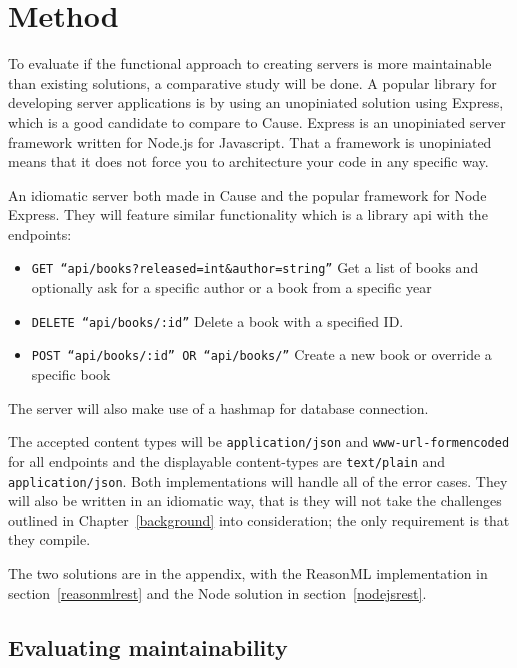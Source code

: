 \chapter{Method}\label{method}

To evaluate if the functional approach to creating servers is more maintainable
than existing solutions, a comparative study will be done. A popular library
for developing server applications is by using an unopiniated solution using
Express, which is a good candidate to compare to Cause. Express is an
unopiniated server framework written for Node.js for Javascript.  That a
framework is unopiniated means that it does not force you to architecture your
code in any specific way.  

An idiomatic server both made in Cause and the popular framework
for Node Express. They will feature similar functionality which is a library api
with the endpoints:

\begin{itemize}
    \item \texttt{GET ``api/books?released=int\&author=string''} Get a list of
    books and optionally ask for a specific author or a book from a specific
    year
    \item \texttt{DELETE ``api/books/:id''} Delete a book with a specified ID.
    \item \texttt{POST ``api/books/:id'' OR ``api/books/''} Create a new book or
    override a specific book
\end{itemize}

The server will also make use of a hashmap for database connection.

The accepted content types will be \texttt{application/json} and
\texttt{www-url-formencoded} for all endpoints and the displayable content-types
are \texttt{text/plain} and \texttt{application/json}. Both implementations will handle
all of the error cases. They will also be written in an idiomatic way, that is
they will not take the challenges outlined in Chapter~\ref{background} into
consideration; the only requirement is that they compile.

The two solutions are in the appendix, with the ReasonML implementation in
section~\ref{reasonmlrest} and the Node solution in section~\ref{nodejsrest}.

\section{Evaluating maintainability}\label{evaluatingmaintainability}

